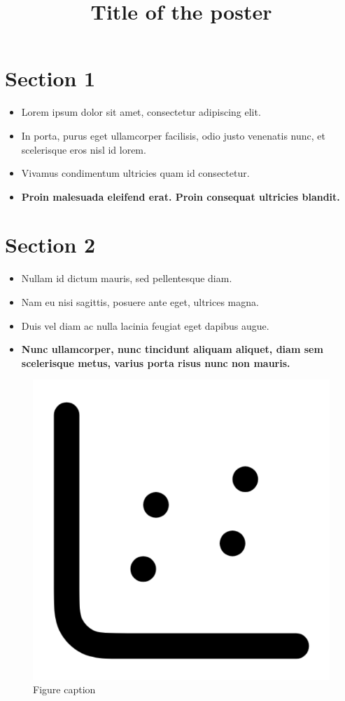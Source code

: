 \documentclass{tudelftposter}
\title{Title of the poster}
\begin{document}
\section{Section 1}

\begin{itemize}

\item Lorem ipsum dolor sit amet, consectetur adipiscing elit.

\item In porta, purus eget ullamcorper facilisis, odio justo venenatis nunc, et scelerisque eros nisl id lorem. 

\item Vivamus condimentum ultricies quam id consectetur.


\item \textbf{Proin malesuada eleifend erat. Proin consequat ultricies blandit.}

\end{itemize}

\section{Section 2}

\begin{itemize}
\item Nullam id dictum mauris, sed pellentesque diam.
\item Nam eu nisi sagittis, posuere ante eget, ultrices magna.
\item Duis vel diam ac nulla lacinia feugiat eget dapibus augue.
\item \textbf{Nunc ullamcorper, nunc tincidunt aliquam aliquet, diam sem scelerisque metus, varius porta risus nunc non mauris. }

\end{itemize}

\begin{figure}[ht]
\centering
\includegraphics[width=0.5\columnwidth]{imgs/dummy_img.png}
\caption{Figure caption}
\label{fig:fig1}
\end{figure}
\end{document}

